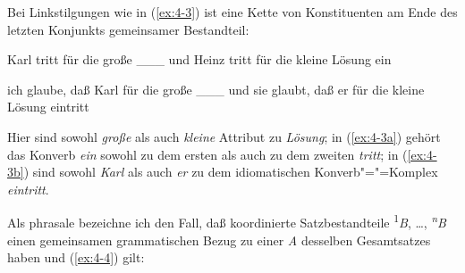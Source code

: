 \documentclass[output=paper]{langsci/langscibook}
\begin{document}
\ssubsection{}%
\label{subsec:4-1-2}
Bei Linkstilgungen wie in (\ref{ex:4-3}) ist eine Kette von Konstituenten am Ende des letzten Konjunkts gemeinsamer Bestandteil:

\begin{exe}
\ex
\label{ex:4-3}
\begin{xlist}
\ex%
\label{ex:4-3a}
Karl tritt für die große \_\_\_ und Heinz tritt für die kleine Lösung ein

\ex%
\label{ex:4-3b}
ich glaube, daß Karl für die große \_\_\_ und sie glaubt, daß er für die kleine Lösung eintritt
\end{xlist}
\end{exe}
Hier sind sowohl \textit{große} als auch \textit{kleine} Attribut zu \textit{Lösung}; in
(\ref{ex:4-3a}) gehört das Konverb \textit{ein} sowohl zu dem ersten als auch zu dem
zweiten \textit{tritt}; in (\ref{ex:4-3b}) sind sowohl \textit{Karl} als auch \textit{er}  zu
dem idiomatischen Konverb"="=Komplex \textit{eintritt}.

\ssubsection{}%
\label{subsec:4-1-3}
Als phrasale  bezeichne ich den Fall, daß koordinierte Satzbestandteile \textsuperscript{1}\textit{B}, \ldots, \textit{\textsuperscript{n}}\textit{B} einen gemeinsamen grammatischen Bezug zu einer  \textit{A} desselben Gesamtsatzes haben und (\ref{ex:4-4}) gilt:
\end{document}
